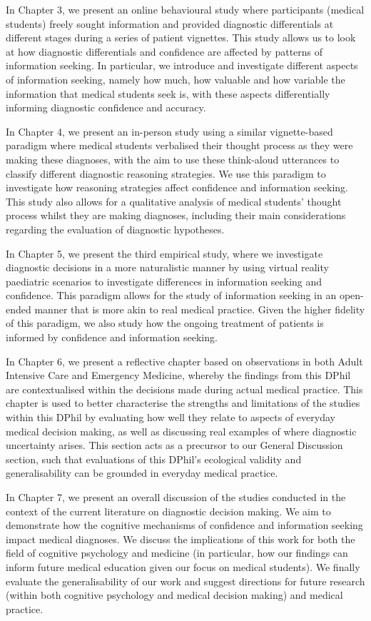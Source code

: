 \documentclass[a4paper, nobind]{templates/ociamthesis}
\begin{document}
\hfill\break
In Chapter 3, we present an online behavioural study where participants (medical students) freely sought information and provided diagnostic differentials at different stages during a series of patient vignettes. This study allows us to look at how diagnostic differentials and confidence are affected by patterns of information seeking. In particular, we introduce and investigate different aspects of information seeking, namely how much, how valuable and how variable the information that medical students seek is, with these aspects differentially informing diagnostic confidence and accuracy.

\hfill\break
In Chapter 4, we present an in-person study using a similar vignette-based paradigm where medical students verbalised their thought process as they were making these diagnoses, with the aim to use these think-aloud utterances to classify different diagnostic reasoning strategies. We use this paradigm to investigate how reasoning strategies affect confidence and information seeking. This study also allows for a qualitative analysis of medical students' thought process whilst they are making diagnoses, including their main considerations regarding the evaluation of diagnostic hypotheses.

\hfill\break
In Chapter 5, we present the third empirical study, where we investigate diagnostic decisions in a more naturalistic manner by using virtual reality paediatric scenarios to investigate differences in information seeking and confidence. This paradigm allows for the study of information seeking in an open-ended manner that is more akin to real medical practice. Given the higher fidelity of this paradigm, we also study how the ongoing treatment of patients is informed by confidence and information seeking.

\hfill\break
In Chapter 6, we present a reflective chapter based on observations in both Adult Intensive Care and Emergency Medicine, whereby the findings from this DPhil are contextualised within the decisions made during actual medical practice. This chapter is used to better characterise the strengths and limitations of the studies within this DPhil by evaluating how well they relate to aspects of everyday medical decision making, as well as discussing real examples of where diagnostic uncertainty arises. This section acts as a precursor to our General Discussion section, such that evaluations of this DPhil's ecological validity and generalisability can be grounded in everyday medical practice.

\hfill\break
In Chapter 7, we present an overall discussion of the studies conducted in the context of the current literature on diagnostic decision making. We aim to demonstrate how the cognitive mechanisms of confidence and information seeking impact medical diagnoses. We discuss the implications of this work for both the field of cognitive psychology and medicine (in particular, how our findings can inform future medical education given our focus on medical students). We finally evaluate the generalisability of our work and suggest directions for future research (within both cognitive psychology and medical decision making) and medical practice.

\end{document}
